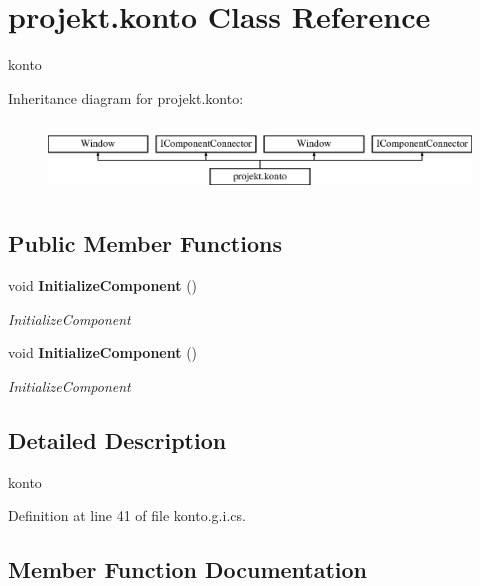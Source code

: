 \section{projekt.\+konto Class Reference}
\label{classprojekt_1_1konto}


konto  


Inheritance diagram for projekt.\+konto\+:\begin{figure}[H]
\begin{center}
\leavevmode
\includegraphics[height=1.931034cm]{classprojekt_1_1konto}
\end{center}
\end{figure}
\subsection*{Public Member Functions}
\begin{DoxyCompactItemize}
\item 
void \textbf{ Initialize\+Component} ()
\begin{DoxyCompactList}\small\item\em Initialize\+Component \end{DoxyCompactList}\item 
void \textbf{ Initialize\+Component} ()
\begin{DoxyCompactList}\small\item\em Initialize\+Component \end{DoxyCompactList}\end{DoxyCompactItemize}


\subsection{Detailed Description}
konto 



Definition at line 41 of file konto.\+g.\+i.\+cs.



\subsection{Member Function Documentation}
\mbox{\label{classprojekt_1_1konto_a7747c72ea9656125d46223a6930f86cf}} 
